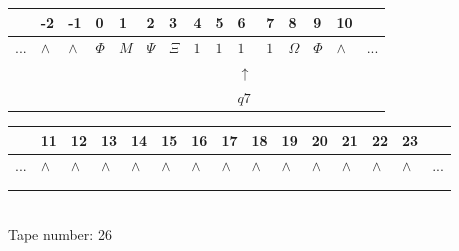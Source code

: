 \documentclass[11pt]{article}
\begin{document}
\begin{table}[H]
\centering
\begin{tabular}{lllllllllllllll}
 & -2 & -1 & 0 & 1 & 2 & 3 & 4 & 5 & 6 & 7 & 8 & 9 & 10 & \\
\hline
$...$ & \multicolumn{1}{|l|}{$\wedge$} & \multicolumn{1}{|l|}{$\wedge$} & \multicolumn{1}{|l|}{$\Phi$} & \multicolumn{1}{|l|}{$M$} & \multicolumn{1}{|l|}{$\Psi$} & \multicolumn{1}{|l|}{$\Xi$} & \multicolumn{1}{|l|}{$1$} & \multicolumn{1}{|l|}{$1$} & \multicolumn{1}{|l|}{$1$} & \multicolumn{1}{|l|}{$1$} & \multicolumn{1}{|l|}{$\Omega$} & \multicolumn{1}{|l|}{$\Phi$} & \multicolumn{1}{|l|}{$\wedge$} & $...$\\
\hline
&  &  &  &  &  &  &  &  & $\uparrow$ &  &  &  &  &  \\
&  &  &  &  &  &  &  &  & $ q7 $ &  &  &  &  &  \\
\end{tabular}
\begin{tabular}{lllllllllllllll}
 & 11 & 12 & 13 & 14 & 15 & 16 & 17 & 18 & 19 & 20 & 21 & 22 & 23 & \\
\hline
$...$ & \multicolumn{1}{|l|}{$\wedge$} & \multicolumn{1}{|l|}{$\wedge$} & \multicolumn{1}{|l|}{$\wedge$} & \multicolumn{1}{|l|}{$\wedge$} & \multicolumn{1}{|l|}{$\wedge$} & \multicolumn{1}{|l|}{$\wedge$} & \multicolumn{1}{|l|}{$\wedge$} & \multicolumn{1}{|l|}{$\wedge$} & \multicolumn{1}{|l|}{$\wedge$} & \multicolumn{1}{|l|}{$\wedge$} & \multicolumn{1}{|l|}{$\wedge$} & \multicolumn{1}{|l|}{$\wedge$} & \multicolumn{1}{|l|}{$\wedge$} & $...$\\
\hline
&  &  &  &  &  &  &  &  &  &  &  &  &  &  \\
&  &  &  &  &  &  &  &  &  &  &  &  &  &  \\
\end{tabular}
\\
Tape number: 26
\noindent\makebox[\linewidth]{\hdashrule{\textwidth}{1pt}{1pt}}\end{table}
\end{document}
